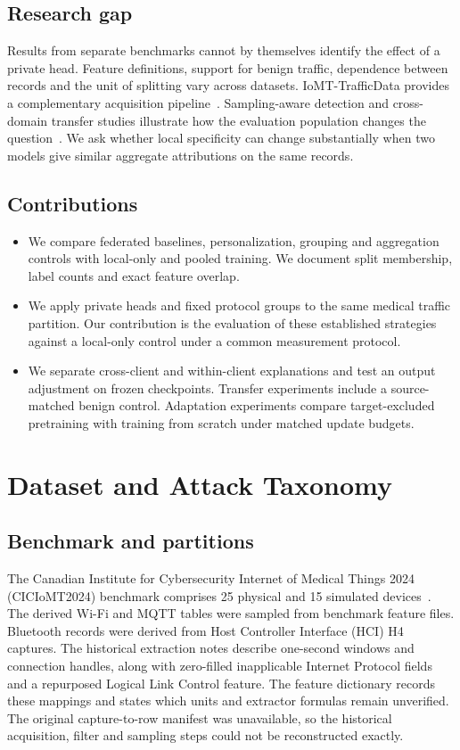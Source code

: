 \documentclass[nolineno]{ieeeaccess}
\begin{document}
\subsection{Research gap}
Results from separate benchmarks cannot by themselves identify the effect of a private head. Feature definitions, support for benign traffic, dependence between records and the unit of splitting vary across datasets. IoMT-TrafficData provides a complementary acquisition pipeline~\cite{iottraffic}. Sampling-aware detection and cross-domain transfer studies illustrate how the evaluation population changes the question~\cite{adaptive,transferstudy,drift}. We ask whether local specificity can change substantially when two models give similar aggregate attributions on the same records.

\subsection{Contributions}
\begin{itemize}
\item We compare federated baselines, personalization, grouping and aggregation controls with local-only and pooled training. We document split membership, label counts and exact feature overlap.
\item We apply private heads and fixed protocol groups to the same medical traffic partition. Our contribution is the evaluation of these established strategies against a local-only control under a common measurement protocol.
\item We separate cross-client and within-client explanations and test an output adjustment on frozen checkpoints. Transfer experiments include a source-matched benign control. Adaptation experiments compare target-excluded pretraining with training from scratch under matched update budgets.
\end{itemize}
\section{Dataset and Attack Taxonomy}
\subsection{Benchmark and partitions}\label{sec:data}
The Canadian Institute for Cybersecurity Internet of Medical Things 2024 (CICIoMT2024) benchmark comprises 25 physical and 15 simulated devices~\cite{dadkhah2024towards}. The derived Wi-Fi and MQTT tables were sampled from benchmark feature files. Bluetooth records were derived from Host Controller Interface (HCI) H4 captures. The historical extraction notes describe one-second windows and connection handles, along with zero-filled inapplicable Internet Protocol fields and a repurposed Logical Link Control feature. The feature dictionary records these mappings and states which units and extractor formulas remain unverified. The original capture-to-row manifest was unavailable, so the historical acquisition, filter and sampling steps could not be reconstructed exactly.
\end{document}
